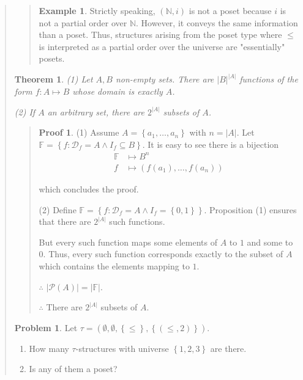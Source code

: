\documentclass[a4paper, 12pt]{article}
\newtheorem{theorem}{Theorem}
\theoremstyle{definition}
\newtheorem{problem}{Problem}
\theoremstyle{definition}
\newtheorem{example}{Example}
\theoremstyle{definition}
\newtheorem{pro}{Proof}
\begin{document}
\begin{quote}
\begin{quote}
\begin{example}
    Strictly speaking, $(\mathbb{N}, i)$ is not a poset because $i$ is not 
    a partial order over $\mathbb{N}$. However, it conveys the same 
    information than a poset. Thus, structures arising from the 
    poset type where $\leq$ is interpreted as a partial order 
    over the universe are "essentially" posets.
\end{example}

\end{quote}
\normalsize

\begin{theorem}
    \textit{(1)} Let $A, B$ non-empty sets. There are $|B|^{|A|}$ functions 
    of the form $f : A \mapsto B$ whose domain is exactly $A$.

    \textit{(2)} If $A$ an arbitrary set, there are $2^{|A|}$ subsets 
    of $A$.
\end{theorem}


\small
\begin{quote}

\begin{pro}
    (1) Assume $A = \left\{ a_1, \ldots, a_n \right\} $ with $n = |A|$. Let 
    $\mathbb{F} = \left\{ f : \mathcal{D}_f = A \land {I}_f \subseteq B \right\} $.
    It is easy to see there is a bijection  
    \begin{align*}
        \mathbb{F} &\mapsto  B^n  \\ 
        f &\mapsto \left( f(a_1),\ldots, f(a_n) \right) 
    \end{align*}

    which concludes the proof. 

    (2) Define $\mathbb{F} = \left\{ f : \mathcal{D}_f = A \land I_f = \left\{
    0, 1 \right\}  \right\} $. Proposition (1) ensures that there are $2^{|A|}$
    such functions. 

    But every such function maps some elements of $A$ to $1$ and 
    some to $0$. Thus, every such function corresponds exactly
    to the subset of $A$ which contains the elements mapping to 
    $1$.

    $\therefore $ $|\mathcal{P}(A)| = |\mathbb{F}|$.

    $\therefore $ There are $2^{|A|}$ subsets of $A$.
\end{pro}

\end{quote}
\normalsize

\begin{problem}
    Let $\tau = \left( \emptyset, \emptyset, \left\{ \leq \right\}, \left\{ (\leq, 2) \right\}   \right) $.  
    \begin{enumerate}
        \item How many $\tau$-structures with universe $\left\{ 1, 2, 3 \right\} $ are there. 
        \item Is any of them a poset? 


\end{enumerate}
\end{problem}
\end{quote}
\end{document}
